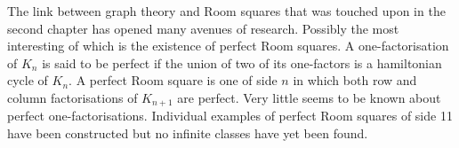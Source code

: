 \documentclass[
  11pt,
  a4paper]{book}
\begin{document}
The link between graph theory and Room squares that was touched upon in
the second chapter has opened many avenues of research. Possibly the
most interesting of which is the existence of perfect Room squares. A
one-factorisation of \(K_n\) is said to be perfect if the union of two of
its one-factors is a hamiltonian cycle of \(K_n\). A perfect Room square
is one of side \(n\) in which both row and column factorisations of
\(K_{n+1}\) are perfect. Very little seems to be known about perfect
one-factorisations. Individual examples of perfect Room squares of side
11 have been constructed but no infinite classes have yet been found.

\printbibliography[title=References]
\end{document}
